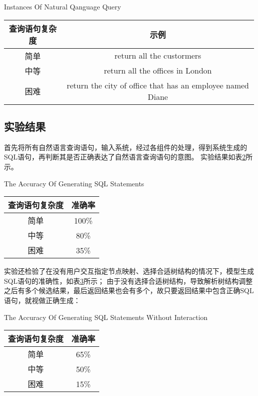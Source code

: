 \begin{table}[!hpb]
    \centering
      {Instances Of Natural Qanguage Query}
    \label{nli:zryycxsl}
    \begin{tabular}{cc} \toprule
      查询语句复杂度 & 示例\\\midrule
      简单 & return all the custormers\\
      中等 & return all the offices in London\\
      困难 & return the city of office that has an employee named Diane\\
      \bottomrule
    \end{tabular}
  \end{table}

\subsection{实验结果}

首先将所有自然语言查询语句，输入系统，经过各组件的处理，得到系统生成的SQL语句，再判断其是否正确表达了自然语言查询语句的意图。
实验结果如表\ref{nli:mxscsyjdzqx}所示。

\begin{table}[!hpb]
    \centering
      {The Accuracy Of Generating SQL Statements}
    \label{nli:mxscsyjdzqx}
    \begin{tabular}{cc} \toprule
      查询语句复杂度 & 准确率\\\midrule
      简单 & 100\%\\
      中等 & 80\%\\
      困难 & 35\%\\
      \bottomrule
    \end{tabular}
\end{table}

实验还检验了在没有用户交互指定节点映射、选择合适树结构的情况下，模型生成SQL语句的准确性，如表\ref{nli:mxzwjhqkxscsyjdzqx}所示；
由于没有选择合适树结构，导致解析树结构调整之后有多个候选结果，最后返回结果也会有多个，故只要返回结果中包含正确SQL语句，就视做正确生成：

\begin{table}[!hpb]
  \centering
    {The Accuracy Of Generating SQL Statements Without Interaction}
  \label{nli:mxzwjhqkxscsyjdzqx}
  \begin{tabular}{cc} \toprule
    查询语句复杂度 & 准确率\\\midrule
    简单 & 65\%\\
    中等 & 50\%\\
    困难 & 15\%\\
    \bottomrule
  \end{tabular}
\end{table}

